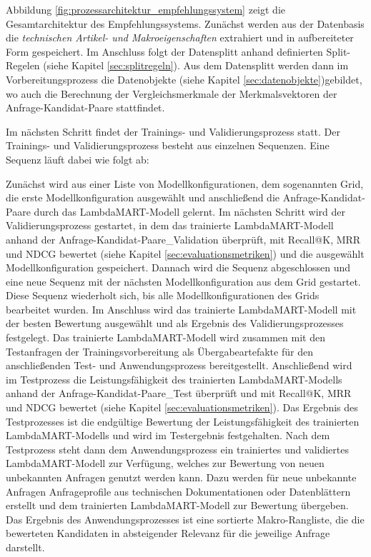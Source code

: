 Abbildung \ref{fig:prozessarchitektur_empfehlungssystem} zeigt die Gesamtarchitektur des Empfehlungssystems. 
Zunächst werden aus der Datenbasis die \textit{technischen Artikel- und Makroeigenschaften} extrahiert und in aufbereiteter Form gespeichert.
Im Anschluss folgt der Datensplitt anhand definierten Split-Regelen (siehe Kapitel \ref{sec:splitregeln}). 
Aus dem Datensplitt werden dann im Vorbereitungsprozess die Datenobjekte (siehe Kapitel \ref{sec:datenobjekte})gebildet, wo auch
die Berechnung der Vergleichsmerkmale der Merkmalsvektoren der Anfrage-Kandidat-Paare stattfindet. 

Im nächsten Schritt findet der Trainings- und Validierungsprozess statt.
Der Trainings- und Validierungsprozess besteht aus einzelnen Sequenzen. Eine Sequenz läuft dabei wie folgt ab: 

Zunächst wird aus einer Liste von Modellkonfigurationen, dem sogenannten Grid, die erste Modellkonfiguration ausgewählt und anschließend die Anfrage-Kandidat-Paare durch das LambdaMART-Modell gelernt.
Im nächsten Schritt wird der Validierungsprozess gestartet, in dem das trainierte LambdaMART-Modell anhand der Anfrage-Kandidat-Paare\_Validation überprüft, mit Recall@K, 
MRR und NDCG bewertet (siehe Kapitel \ref{sec:evaluationsmetriken}) und die ausgewählt Modellkonfiguration gespeichert.
Dannach wird die Sequenz abgeschlossen und eine neue Sequenz mit der nächsten Modellkonfiguration aus dem Grid gestartet. 
Diese Sequenz wiederholt sich, bis alle Modellkonfigurationen des Grids bearbeitet wurden. 
Im Anschluss wird das trainierte LambdaMART-Modell mit der besten Bewertung ausgewählt und als Ergebnis des Validierungsprozesses festgelegt.
Das trainierte LambdaMART-Modell wird zusammen mit den Testanfragen der Trainingsvorbereitung als Übergabeartefakte für den anschließenden Test- und Anwendungsprozess bereitgestellt.
Anschließend wird im Testprozess die Leistungsfähigkeit des trainierten LambdaMART-Modells anhand der Anfrage-Kandidat-Paare\_Test überprüft und mit Recall@K, MRR und NDCG bewertet (siehe Kapitel \ref{sec:evaluationsmetriken}).
Das Ergebnis des Testprozesses ist die endgültige Bewertung der Leistungsfähigkeit des trainierten LambdaMART-Modells  und wird im Testergebnis festgehalten. 
Nach dem Testprozess steht dann dem Anwendungsprozess ein trainiertes und validiertes LambdaMART-Modell zur Verfügung, welches zur Bewertung von neuen unbekannten Anfragen genutzt werden kann.
Dazu werden für neue unbekannte Anfragen Anfrageprofile aus technischen Dokumentationen oder Datenblättern erstellt und dem trainierten LambdaMART-Modell zur Bewertung übergeben.
Das Ergebnis des Anwendungsprozesses ist eine sortierte Makro-Rangliste, die die bewerteten Kandidaten in absteigender Relevanz für die jeweilige Anfrage darstellt.


